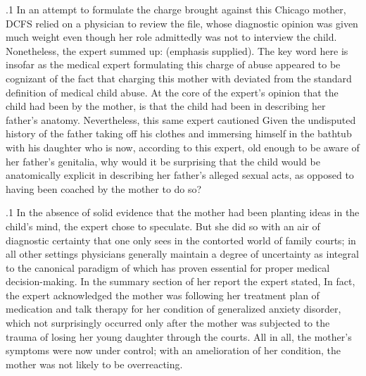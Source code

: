 \documentclass[11pt, twoside]{article}
\begin{document}
{\p.1{%
In an attempt to formulate the  charge brought
against this Chicago mother, DCFS relied on a physician to review the
file, whose diagnostic opinion was given much weight even though her
role admittedly was not to interview the child. Nonetheless, the expert
summed up:  (emphasis supplied). The key word here is  insofar as the medical expert
formulating this charge of abuse appeared to be cognizant of the fact
that charging this mother with  deviated from the
standard definition of medical child abuse. At the core of the expert's
opinion that the child had been  by the mother, is that the
child had been  in describing her father's anatomy. Nevertheless, this same expert cautioned  Given the undisputed history of the father taking off his
clothes and immersing himself in the bathtub with his daughter who
is now, according to this expert, old enough to be aware of her father's
genitalia, why would it be surprising that the child would be anatomically explicit in describing her father's alleged sexual acts, as opposed to
having been coached by the mother to do so?
}%

\p.1{%
In the absence of solid evidence that the mother had been planting
ideas in the child's mind, the expert chose to speculate. But she did so
with an air of diagnostic certainty that one only sees in the contorted
world of family courts; in all other settings physicians generally maintain a degree of uncertainty as integral to the canonical paradigm of
 which has proven essential for proper medical decision-making. In the summary section of her report the expert
stated,  In fact,
the expert acknowledged the mother was following her treatment plan
of medication and talk therapy for her condition of generalized anxiety disorder, which not surprisingly occurred only after the mother
was subjected to the trauma of losing her young daughter through
the courts. All in all, the mother's symptoms were now under control;
with an amelioration of her condition, the mother was not likely to be
overreacting.
}%

}
\end{document}
